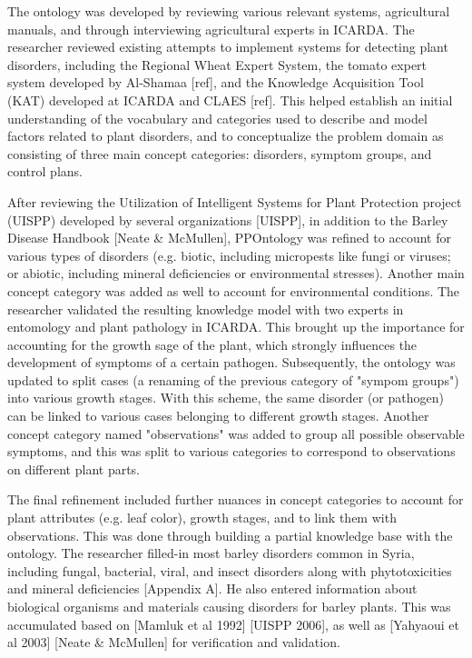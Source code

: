 \documentclass{frontiersSCNS} %
\begin{document}
The ontology was developed by reviewing various relevant systems, agricultural manuals, and through interviewing agricultural experts in ICARDA. The researcher reviewed existing attempts to implement systems for detecting plant disorders, including the Regional Wheat Expert System, the tomato expert system developed by Al-Shamaa [ref], and the Knowledge Acquisition Tool (KAT) developed at ICARDA and
CLAES [ref]. This helped establish an initial understanding of the vocabulary and categories used to describe and model factors related to plant disorders, and to conceptualize the problem domain as consisting of three main concept categories: disorders, symptom groups, and control plans.

After reviewing the Utilization of Intelligent Systems for Plant Protection project (UISPP) developed by several organizations [UISPP], in addition to the Barley Disease Handbook [Neate & McMullen], PPOntology was refined to account for various types of disorders (e.g. biotic, including micropests like fungi or viruses; or abiotic, including mineral deficiencies or environmental stresses). Another main concept category was added as well to account for environmental conditions. The researcher validated the resulting knowledge model with two experts in entomology and plant pathology in ICARDA. This brought up the importance for accounting for the growth sage of the plant, which strongly influences the development of symptoms of a certain pathogen. Subsequently, the ontology was updated to split cases (a renaming of the previous category of "sympom groups") into various growth stages. With this scheme, the same disorder (or pathogen) can be linked to various cases belonging to different growth stages. Another concept category named "observations" was added to group all possible observable symptoms, and this was split to various categories to correspond to observations on different plant parts.

The final refinement included further nuances in concept categories to account for plant attributes (e.g. leaf color), growth stages, and to link them with observations. This was done through building a partial knowledge base with the ontology. The researcher filled-in most barley disorders common in Syria, including fungal, bacterial, viral, and insect disorders along with phytotoxicities and mineral deficiencies [Appendix A]. He also entered information about biological organisms and materials causing disorders for barley plants. This was accumulated based on [Mamluk et al 1992] [UISPP 2006], as well as [Yahyaoui et al 2003] [Neate & McMullen] for verification and validation.
\end{document}
